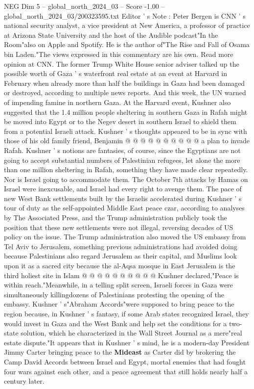 \begin{textsample}{NEG Dim 5 – global\_north\_2024\_03 – Score -1.00 – global\_north\_2024\_03/200323595.txt}  \label{ex:f5_neg_160}
Editor ' s Note : Peter Bergen is CNN ' s national security analyst, a vice president at New America, a professor of practice at Arizona State University and the host of the Audible podcast"In the Room"also on Apple and Spotify.
He is the author of"The Rise and Fall of Osama bin Laden."The views expressed in this commentary are his own.
Read more opinion at CNN.
The former Trump White House senior adviser talked up the possible worth of Gaza ' s waterfront real estate at an event at Harvard in February when already more than half the buildings in Gaza had been damaged or destroyed, according to multiple news reports.
And this week, the UN warned of impending famine in northern Gaza.
At the Harvard event, Kushner also suggested that the 1.4 million people sheltering in southern Gaza in Rafah might be moved into Egypt or to the Negev desert in southern Israel to shield them from a potential Israeli attack.
Kushner ' s thoughts appeared to be in sync with those of his old family friend, Benjamin @ @ @ @ @ @ @ @ @ @ a plan to invade Rafah.
Kushner ' s notions are fantasies, of course, since the Egyptians are not going to accept substantial numbers of Palestinian refugees, let alone the more than one million sheltering in Rafah, something they have made clear repeatedly.
Nor is Israel going to accommodate them.
The October 7th attacks by Hamas on Israel were inexcusable, and Israel had every right to avenge them.
The pace of new West Bank settlements built by the Israelis accelerated during Kushner ' s tour of duty as the self-appointed Middle East peace czar, according to analyses by The Associated Press, and the Trump administration publicly took the position that these new settlements were not illegal, reversing decades of US policy on the issue.
The Trump administration also moved the US embassy from Tel Aviv to Jerusalem, something previous administrations had avoided doing because Palestinians also regard Jerusalem as their capital, and Muslims look upon it as a sacred city because the al-Aqsa mosque in East Jerusalem is the third holiest site in Islam @ @ @ @ @ @ @ @ @ @ Kushner declared,"Peace is within reach."Meanwhile, in a telling split screen, Israeli forces in Gaza were simultaneously killingdozens of Palestinians protesting the opening of the embassy.
Kushner ' s"Abraham Accords"were supposed to bring peace to the region because, in Kushner ' s fantasy, if some Arab states recognized Israel, they would invest in Gaza and the West Bank and help set the conditions for a two-state solution, which he characterized in the Wall Street Journal as a mere"real estate dispute."It appears that in Kushner ' s mind, he is a modern-day President Jimmy Carter bringing peace to the \textbf{Mideast} as Carter did by brokering the Camp David Accords between Israel and Egypt, mortal enemies that had fought four wars against each other, and a peace agreement that still holds nearly half a century later.

\end{textsample}
